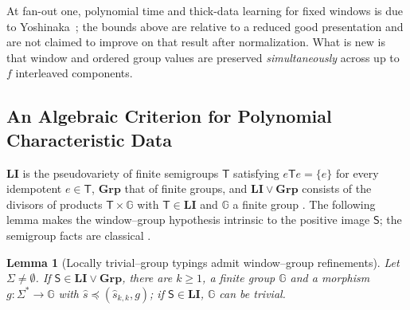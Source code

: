\documentclass[11pt]{article}
\numberwithin{equation}{section}
\theoremstyle{plain}
\newtheorem{lemma}[theorem]{Lemma}
\theoremstyle{definition}
\theoremstyle{remark}
\begin{document}
At fan-out one, polynomial time and thick-data learning for fixed windows is due
to Yoshinaka~\cite[Theorem~1]{Yoshinaka2008}; the bounds above are relative to a
reduced good presentation and are not claimed to improve on that result after
normalization.  What is new is that window and ordered group values are preserved
\emph{simultaneously} across up to $f$ interleaved components.

\subsection{An Algebraic Criterion for Polynomial Characteristic Data}
\label{subsec:algebraic-typed-data}

$\mathbf{LI}$ is the pseudovariety of finite semigroups $\mathsf T$ satisfying
$e\mathsf Te=\{e\}$ for every idempotent $e\in \mathsf T$, $\mathbf{Grp}$ that of finite
groups, and $\mathbf{LI}\vee\mathbf{Grp}$ consists of the divisors of
products $\mathsf T\times {\mathbb G}$ with $\mathsf T\in\mathbf{LI}$ and ${\mathbb G}$ a finite group \cite{Costa2002LI,Costa2002LIG}.
The following lemma makes the window--group hypothesis intrinsic to the
positive image $\mathsf S$; the semigroup facts are classical \cite{Pin1986}.

\begin{lemma}[Locally trivial--group typings admit window--group refinements]
\label{lem:mcfg-li-group-window}
Let $\Sigma\ne\emptyset$.  If $\mathsf S\in\mathbf{LI}\vee\mathbf{Grp}$, there are
$k\ge1$, a finite group ${\mathbb G}$ and a morphism $g:\Sigma^*\to {\mathbb G}$ with
$\widehat s\preceq(\widehat s_{k,k},g)$; if $\mathsf S\in\mathbf{LI}$, ${\mathbb G}$ can be
trivial.
\end{lemma}
\end{document}
